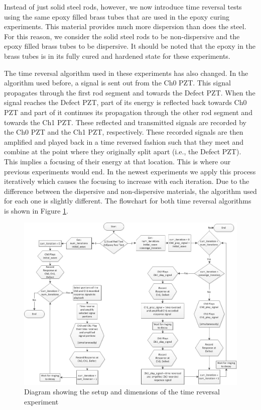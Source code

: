 \documentclass[]{aiaa-tc}%
\begin{document}
Instead of just solid steel rods, however, we now introduce time reversal tests using the same epoxy filled brass tubes that are used in the epoxy curing experiments. This material provides much more dispersion than does the steel. For this reason, we consider the solid steel rods to be non-dispersive and the epoxy filled brass tubes to be dispersive. It should be noted that the epoxy in the brass tubes is in its fully cured and hardened state for these experiments. 

The time reversal algorithm used in these experiments has also changed. In the algorithm used before, a signal is sent out from the Ch0 PZT. This signal propagates through the first rod segment and towards the Defect PZT. When the signal reaches the Defect PZT, part of its energy is reflected back towards Ch0 PZT and part of it continues its propagation through the other rod segment and towards the Ch1 PZT. These reflected and transmitted signals are recorded by the Ch0 PZT and the Ch1 PZT, respectively. These recorded signals are then amplified and played back in a time reversed fashion such that they meet and combine at the point where they originally split apart (i.e., the Defect PZT). This implies a focusing of their energy at that location. This is where our previous experiments would end. In the newest experiments we apply this process iteratively which causes the focusing to increase with each iteration. Due to the difference between the dispersive and non-dispersive materials, the algorithm used for each one is slightly different. The flowchart for both time reversal algorithms is shown in Figure \ref{fig:tr_flowchart}.

\begin{figure}[H]%
 \includegraphics{tr_flowchart}
 \centering
 \caption{Diagram showing the setup and dimensions of the time reversal experiment}
 \label{fig:tr_flowchart}
\end{figure}
\end{document}
